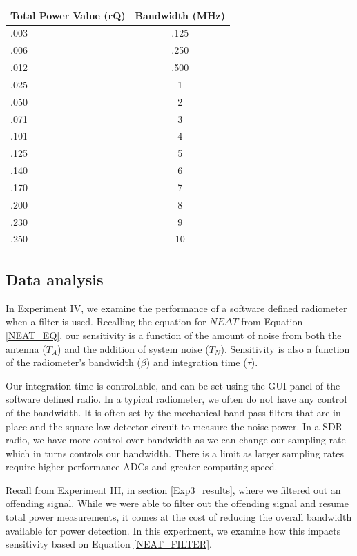 \begin{table}[h!tb] \centering
{}
\label{exp4_datapoints}
\begin{tabular}{lc} \hline
\textbf{Total Power Value (rQ)} & \textbf{Bandwidth (MHz)} \\ \hline
.003 & .125 \\
.006 & .250 \\
.012 & .500 \\
.025 & 1 \\
.050 & 2 \\
.071 & 3 \\
.101 & 4 \\
.125 & 5 \\
.140 & 6 \\
.170 & 7 \\
.200 & 8 \\
.230 & 9 \\
.250 & 10 \\ \hline
\end{tabular}
\end{table}

\subsection{Data analysis}

In Experiment IV, we examine the performance of a software defined radiometer when a filter is used.  Recalling the equation for $NE\Delta T$ from Equation \ref{NEAT_EQ}, our sensitivity is a function of the amount of noise from both the antenna ($T_{A}$) and the addition of system noise ($T_{N}$).  Sensitivity is also a function of the radiometer's bandwidth ($\beta$) and integration time ($\tau$).

Our integration time is controllable, and can be set using the GUI panel of the software defined radio.  In a typical radiometer, we often do not have any control of the bandwidth.  It is often set by the mechanical band-pass filters that are in place and the square-law detector circuit to measure the noise power.  In a SDR radio, we have more control over bandwidth as we can change our sampling rate which in turns controls our bandwidth.  There is a limit as larger sampling rates require higher performance ADCs and greater computing speed.

Recall from Experiment III, in section \ref{Exp3_results}, where we filtered out an offending signal.  While we were able to filter out the offending signal and resume total power measurements, it comes at the cost of reducing the overall bandwidth available for power detection.  In this experiment, we examine how this impacts sensitivity based on Equation \ref{NEAT_FILTER}.

